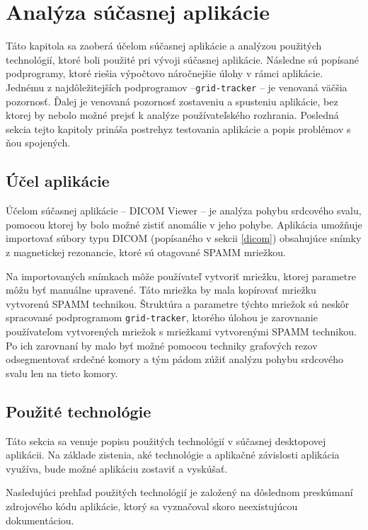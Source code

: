 \chapter {Analýza súčasnej aplikácie}
Táto kapitola sa zaoberá účelom súčasnej aplikácie a analýzou použitých technológií, ktoré boli použité pri vývoji súčasnej aplikácie. Následne sú popísané podprogramy, ktoré riešia výpočtovo náročnejšie úlohy v rámci aplikácie. Jednému z najdôležitejších podprogramov --\texttt{grid-tracker} -- je venovaná väčšia pozornosť. Ďalej je venovaná pozornosť zostaveniu a spusteniu aplikácie, bez ktorej by nebolo možné prejsť k analýze používateľského rozhrania. Posledná sekcia tejto kapitoly prináša postrehy\newline z testovania aplikácie a popis problémov s ňou spojených.

\section {Účel aplikácie}
Účelom súčasnej aplikácie -- DICOM Viewer -- je analýza pohybu srdcového svalu, pomocou ktorej by bolo možné zistiť anomálie v jeho pohybe. Aplikácia umožňuje importovať súbory typu DICOM (popísaného v sekcii \ref{dicom}) obsahujúce snímky z magnetickej rezonancie, ktoré sú otagované SPAMM mriežkou.

Na importovaných snímkach môže používateľ vytvoriť mriežku, ktorej parametre môžu byť manuálne upravené. Táto mriežka by mala kopírovať mriežku vytvorenú SPAMM technikou. Štruktúra a parametre týchto mriežok sú neskôr spracované podprogramom \texttt{grid-tracker}, ktorého úlohou je zarovnanie používateľom vytvorených mriežok s mriežkami vytvorenými SPAMM technikou. Po ich zarovnaní by malo byť možné pomocou techniky grafových rezov odsegmentovať srdečné komory a tým pádom zúžiť analýzu pohybu srdcového svalu len na tieto komory. \clearpage

\section {Použité technológie}
Táto sekcia sa venuje popisu použitých technológií v súčasnej desktopovej aplikácii. Na základe zistenia, aké technológie a aplikačné závislosti aplikácia využíva, bude možné aplikáciu zostaviť a vyskúšať.

Nasledujúci prehľad použitých technológií je založený na dôslednom preskúmaní zdrojového kódu aplikácie, ktorý sa vyznačoval skoro neexistujúcou dokumentáciou.

